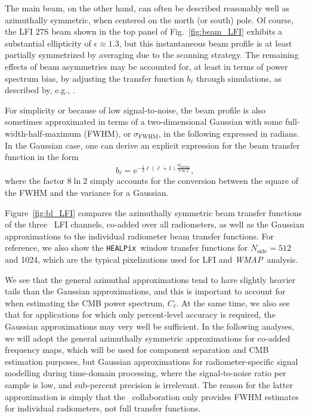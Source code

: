 \documentclass[twocolumn]{aa}
\def\WMAP{\emph{WMAP}}
\newcommand{\HEALPix}[0]{\texttt{HEALPix}}
\newcommand{\e}{\mathrm e}
\begin{document}
The main beam, on the other hand, can often be described reasonably
well as azimuthally symmetric, when centered on the north (or south)
pole. Of course, the LFI 27S beam shown in the top panel of
Fig.~\ref{fig:beam_LFI} exhibits a substantial ellipticity of
$\epsilon \approx 1.3$, but this instantaneous beam profile is at
least partially symmetrized by averaging due to the scanning strategy. 
The remaining effects of beam asymmetries may be accounted for, at least
in terms of power spectrum bias, by adjusting the transfer function
$b_{\ell}$ through simulations, as described by, e.g.,
\citet{mitra2010}.

For simplicity or because of low signal-to-noise, the beam profile is also
sometimes approximated in terms of a two-dimensional Gaussian with
some full-width-half-maximum (FWHM), or $\sigma_{\mathrm{FWHM}}$, in the
following expressed in radians. In the Gaussian case, one can derive an
explicit expression for the beam transfer function in the form
\begin{equation}
  b_{\ell} = \e^{-\frac{1}{2}\ell(\ell+1)\frac{\sigma_{\mathrm{FWHM}}^2}{8\ln 2}},
\end{equation}
where the factor $8\ln 2$ simply accounts for the conversion between
the square of the FWHM and the variance for a Gaussian.

Figure~\ref{fig:bl_LFI} compares the azimuthally symmetric beam
transfer functions of the three \Planck\ LFI channels, co-added over
all radiometers, as well as the Gaussian approximations to the
individual radiometer beam transfer functions. For reference, we also
show the \HEALPix\ window transfer functions for $N_{\mathrm{side}}=512$ and
1024, which are the typical pixelizations used for LFI and \WMAP\
analysis.

We see that the general azimuthal approximations tend to have slightly
heavier tails than the Gaussian approximations, and this is important
to account for when estimating the CMB power spectrum, $C_{\ell}$. At
the same time, we also see that for applications for which only
percent-level accuracy is required, the Gaussian approximations may
very well be sufficient. In the following analyses, we will adopt the
general azimuthally symmetric approximations for co-added frequency
maps, which will be used for component separation and CMB estimation
purposes, but Gaussian approximations for radiometer-specific signal
modelling during time-domain processing, where the signal-to-noise
ratio per sample is low, and sub-percent precision is irrelevant. The
reason for the latter approximation is simply that the
\Planck\ collaboration only provides FWHM estimates for individual
radiometers, not full transfer functions.
\end{document}
